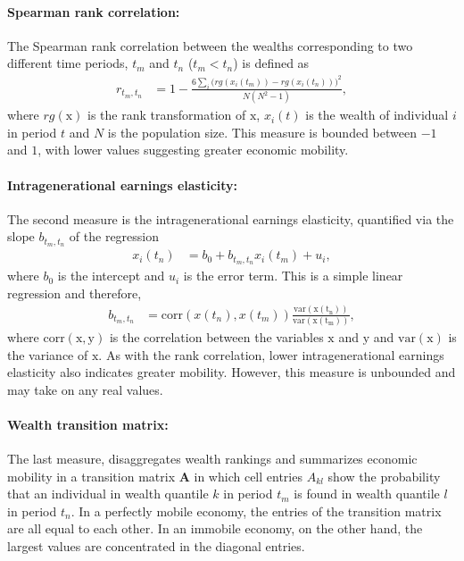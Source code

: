 \documentclass[11pt]{article}
\numberwithin{equation}{section}
\begin{document}
\paragraph{Spearman rank correlation:} The Spearman rank correlation between the wealths corresponding to two different time periods, $t_m$ and $t_n$ ($t_m < t_n$) is defined as
\begin{align*}
    r_{t_m,t_n} &= 1 - \frac{6\sum_i \big(rg(x_i(t_m)) - rg(x_i(t_n))\big)^2}{N(N^2-1)},
\end{align*}
where $rg(\mathrm{x})$ is the rank transformation of $\mathrm{x}$, $x_i(t)$ is the wealth of individual $i$ in period $t$ and $N$ is the population size. This measure is bounded between $-1$ and $1$, with lower values suggesting greater economic mobility.

\paragraph{Intragenerational earnings elasticity:} The second measure is the intragenerational earnings elasticity, quantified via the slope $b_{t_m,t_n}$ of the regression
\begin{align*}
    x_i(t_n) &= b_0 + b_{t_m,t_n} x_i(t_m) + u_i,
\end{align*}
where $b_0$ is the intercept and $u_i$ is the error term. This is a simple linear regression and therefore,
\begin{align}
    b_{t_m,t_n} &= \mathrm{corr}(x(t_n),x(t_m)) \frac{\mathrm{var(x(t_n))}}{\mathrm{var(x(t_m))}},
    \label{eq:iee-estimation}
\end{align}
where $\mathrm{corr}(\mathrm{x},\mathrm{y})$ is the correlation between the variables $\mathrm{x}$ and $\mathrm{y}$ and $\mathrm{var}(\mathrm{x})$ is the variance of $\mathrm{x}$. As with the rank correlation, lower intragenerational earnings elasticity also indicates greater mobility. However, this measure is unbounded and may take on any real values.

\paragraph{Wealth transition matrix:} The last measure, disaggregates wealth rankings and summarizes economic mobility in a
transition matrix $\mathbf{A}$ in which cell entries $A_{kl}$ show the probability that an individual in wealth quantile $k$ in period $t_m$ is found in wealth quantile $l$ in period $t_n$. In a perfectly mobile economy, the entries of the transition matrix are all equal to each other. In an immobile economy, on the other hand, the largest values are concentrated in the diagonal entries.
\end{document}
